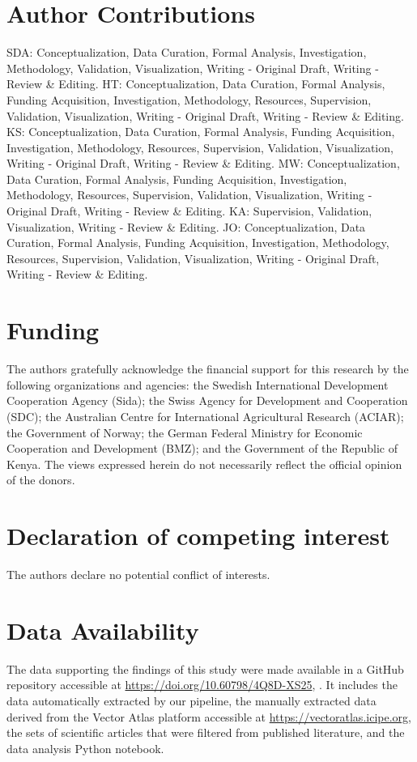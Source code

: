 \documentclass{article}
\begin{document}
\section*{Author Contributions}
SDA: Conceptualization, Data Curation, Formal Analysis, Investigation, Methodology, Validation, Visualization, 
Writing - Original Draft, Writing - Review \& Editing. 
HT: Conceptualization, Data Curation, Formal Analysis, Funding Acquisition, Investigation, Methodology, 
Resources, Supervision, Validation, Visualization, Writing - 
Original Draft, Writing - Review \& Editing. KS: Conceptualization, Data Curation, Formal Analysis, Funding 
Acquisition, Investigation, Methodology, Resources, 
Supervision, Validation, Visualization, Writing - Original Draft, Writing - Review \& Editing. MW: 
Conceptualization, Data Curation, Formal Analysis, Funding Acquisition, 
Investigation, Methodology, Resources, Supervision, Validation, Visualization, Writing - Original Draft, 
Writing - Review \& Editing. KA: Supervision, Validation, 
Visualization, Writing - Review \& Editing. JO: Conceptualization, 
Data Curation, Formal Analysis, Funding Acquisition, Investigation, Methodology, Resources, Supervision, 
Validation, Visualization, Writing - Original Draft, Writing - 
Review \& Editing.

\section*{Funding}
The authors gratefully acknowledge the financial support for this research by the following organizations and 
agencies: the Swedish International Development Cooperation 
Agency (Sida); the Swiss Agency for Development and Cooperation (SDC); the Australian Centre for International 
Agricultural Research (ACIAR); the Government of Norway;
the German Federal Ministry for Economic Cooperation and Development (BMZ); and the Government of the Republic 
of Kenya. The views expressed herein do not necessarily reflect the official opinion of the donors.

\section*{Declaration of competing interest}
The authors declare no potential conflict of interests.

\section*{Data Availability}
The data supporting the findings of this study were made available in a GitHub repository accessible 
at \url{https://doi.org/10.60798/4Q8D-XS25}, \citep{2025.SD.GAD}. It includes the data automatically 
extracted by our pipeline, the manually extracted data derived from the Vector Atlas platform accessible 
at \url{https://vectoratlas.icipe.org}, the sets of scientific articles that were filtered from published 
literature, and the data analysis Python notebook.




\end{document}

